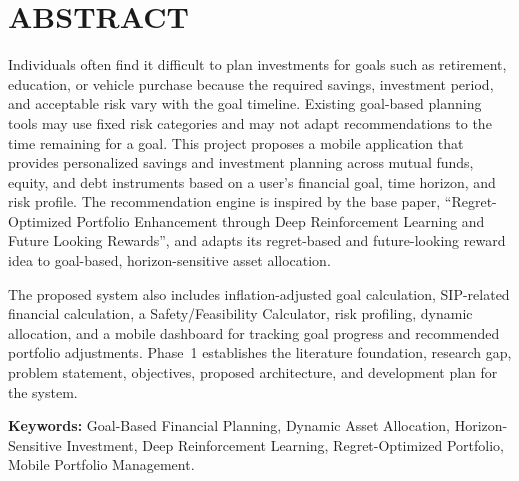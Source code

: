 \chapter*{\centering \uppercase{Abstract}}%

Individuals often find it difficult to plan investments for goals such as retirement, education, or vehicle purchase because the required savings, investment period, and acceptable risk vary with the goal timeline. Existing goal-based planning tools may use fixed risk categories and may not adapt recommendations to the time remaining for a goal. This project proposes a mobile application that provides personalized savings and investment planning across mutual funds, equity, and debt instruments based on a user's financial goal, time horizon, and risk profile. The recommendation engine is inspired by the base paper, ``Regret-Optimized Portfolio Enhancement through Deep Reinforcement Learning and Future Looking Rewards'', and adapts its regret-based and future-looking reward idea to goal-based, horizon-sensitive asset allocation.

The proposed system also includes inflation-adjusted goal calculation, SIP-related financial calculation, a Safety/Feasibility Calculator, risk profiling, dynamic allocation, and a mobile dashboard for tracking goal progress and recommended portfolio adjustments. Phase~1 establishes the literature foundation, research gap, problem statement, objectives, proposed architecture, and development plan for the system.

\vspace{1em}
\noindent\textbf{Keywords:} Goal-Based Financial Planning, Dynamic Asset Allocation, Horizon-Sensitive Investment, Deep Reinforcement Learning, Regret-Optimized Portfolio, Mobile Portfolio Management.

\thispagestyle{plain}